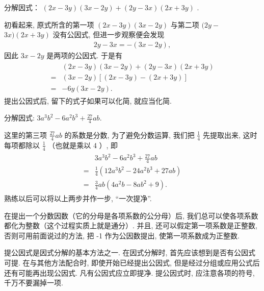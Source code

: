 \begin{example}[仔细观察]\label{ex:提公因式-例5-仔细观察}
	分解因式： $(2 x-3 y)(3 x-2 y)+(2 y-3 x)(2 x+3 y)$ .
\end{example}
\begin{solution}
	初看起来, 原式所含的第一项 $(2 x-3 y)(3 x-2 y)$ 与第二项 $(2 y-$ $3 x)(2 x+3 y)$ 没有公因式, 但进一步观察便会发现
	\begin{align*}
		2 y-3 x=-(3 x-2 y),
	\end{align*}
	因此 $3 x-2 y$ 是两项的公因式. 于是有
	\begin{align*}
		\begin{aligned}
			  & (2 x-3 y)(3 x-2 y)+(2 y-3 x)(2 x+3 y) \\
			= & (3 x-2 y)[(2 x-3 y)-(2 x+3 y)]        \\
			= & -6 y(3 x-2 y) .
		\end{aligned}
	\end{align*}
	提出公因式后, 留下的式子如果可以化简, 就应当化简.
\end{solution}

\begin{example}[化“分”为整]\label{ex:提公因式-例6-化分为整}
	分解因式: $3 a^{3} b^{2}-6 a^{2} b^{3}+\frac{27}{4} a b$.
\end{example}
\begin{solution}
	这里的第三项 $\frac{27}{4} a b$ 的系数是分数, 为了避免分数运算, 我们把 $\frac{1}{4}$ 先提取出来, 这时每项都除以 $\frac{1}{4}$ （也就是乘以 4 ）, 即
	\begin{align*}
		\begin{aligned}
			  & 3 a^{3} b^{2}-6 a^{2} b^{3}+\frac{27}{4} a b                 \\
			= & \frac{1}{4}\left(12 a^{3} b^{2}-24 a^{2} b^{3}+27 a b\right) \\
			= & \frac{3}{4} a b\left(4 a^{2} b-8 a b^{2}+9\right) .
		\end{aligned}
	\end{align*}
	熟练以后可以将以上两步并作一步, “一次提净”.

	在提出一个分数因数（它的分母是各项系数的公分母）后, 我们总可以使各项系数都化为整数（这个过程实质上就是通分）. 并且, 还可以假定第一项系数是正整数, 否则可用前面说过的方法, 把 -1 作为公因数提出, 使第一项系数成为正整数.
\end{solution}
\begin{note}
	提公因式是因式分解的基本方法之一. 在因式分解时, 首先应该想到是否有公因式可提. 在与其他方法配合时, 即使开始已经提出公因式, 但是经过分组或应用公式后还有可能再出现公因式. 凡有公因式应立即提净. 提公因式时, 应注意各项的符号, 千万不要漏掉一项.
\end{note}

